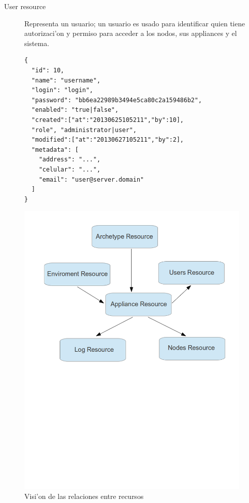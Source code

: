 \begin{description}
\item [User resource]  Representa un usuario; un usuario es usado para identificar quien tiene autorizaci'on y permiso para acceder a los nodos, sus appliances y el sistema.
\medskip
\begin{lstlisting}
{
  "id": 10,
  "name": "username",
  "login": "login",
  "password": "bb6ea22989b3494e5ca80c2a159486b2",
  "enabled": "true|false",
  "created":["at":"20130625105211","by":10],
  "role", "administrator|user",
  "modified":["at":"20130627105211","by":2],
  "metadata": [
    "address": "...",
    "celular": "...",
    "email": "user@server.domain"
  ]  
}
\end{lstlisting}



\end{description}

\begin{figure}[hbp]
 \centering
 \includegraphics[scale=0.44]{fig/RelationshipsBetweenResources}
 \caption{Visi'on de las relaciones entre recursos}
 \label{fig:caption-bottom}
\end{figure}

